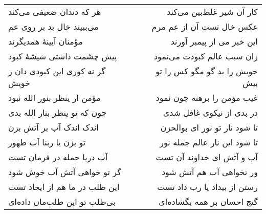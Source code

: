 \begin{center}
\begin{longtable}{l p{0.5cm} r}
\\
هر که دندان ضعیفی می‌کند
&&
کار آن شیر غلط‌بین می‌کند
\\
می‌ببیند خال بد بر روی عم
&&
عکس خال تست آن از عم مرم
\\
مؤمنان آیینهٔ همدیگرند
&&
این خبر می از پیمبر آورند
\\
پیش چشمت داشتی شیشهٔ کبود
&&
زان سبب عالم کبودت می‌نمود
\\
گر نه کوری این کبودی دان ز خویش
&&
خویش را بد گو مگو کس را تو بیش
\\
مؤمن ار ینظر بنور الله نبود
&&
غیب مؤمن را برهنه چون نمود
\\
چون که تو ینظر بنار الله بدی
&&
در بدی از نیکوی غافل شدی
\\
اندک اندک آب بر آتش بزن
&&
تا شود نار تو نور ای بوالحزن
\\
تو بزن یا ربنا آب طهور
&&
تا شود این نار عالم جمله نور
\\
آب دریا جمله در فرمان تست
&&
آب و آتش ای خداوند آن تست
\\
گر تو خواهی آتش آب خوش شود
&&
ور نخواهی آب هم آتش شود
\\
این طلب در ما هم از ایجاد تست
&&
رستن از بیداد یا رب داد تست
\\
بی‌طلب تو این طلب‌مان داده‌ای
&&
گنج احسان بر همه بگشاده‌ای
\\
\end{longtable}
\end{center}
